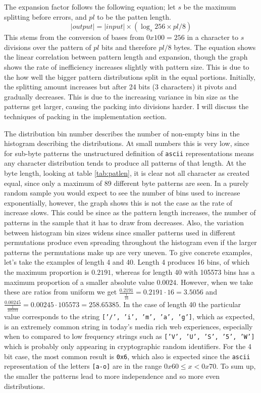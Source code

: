 \documentclass[ %
                    author={Samuel Russell},
                supervisor={Prof. Bogdan Warinschi},
                    degree={MEng},
                     title={Innocuous Ciphertexts},
                  subtitle={The DE-CENSOR Scheme},
                      type={research},
                      year={2018} ]{dissertation}
\begin{document}
The expansion factor follows the following equation; let $s$ be the maximum splitting before errors, and $pl$ to be the patten length.
$$|output| = |input| \times \left( \log_s 256 \times pl / 8 \right)$$ 
This stems from the conversion of bases from $0x100=256$ in a character to $s$ divisions over the pattern of $pl$ bits and therefore $pl/8$ bytes. The equation shows the linear correlation between pattern length and expansion, though the graph shows the rate of inefficiency increases slightly with pattern size. This is due to the how well the bigger pattern distributions split in the equal portions. Initially, the splitting amount increases but after 24 bits (3 characters) it pivots and gradually decreases.  This is due to the increasing variance in bin size as the patterns get larger, causing the packing into divisions harder. I will discuss the techniques of packing in the implementation section. 

The distribution bin number describes the number of non-empty bins in the histogram describing the distributions.
At small numbers this is very low, since for sub-byte patterns the unstructured definition of \texttt{ascii} representations means any character distribution tends to produce all patterns of that length.
At the byte length, looking at table \ref{tab:patlen}, it is clear not all character as created equal, since only a maximum of 89 different byte patterns are seen.
In a purely random sample you would expect to see the number of bins used to increase exponentially, however, the graph shows this is not the case as the rate of increase slows.
This could be since as the pattern length increases, the number of patterns in the sample that it has to draw from decreases.
Also, the variation between histogram bin sizes widens since smaller patterns used in different permutations produce even spreading throughout the histogram even if the larger patterns the permutations make up are very uneven.
To give concrete examples, let's take the examples of length 4 and 40.
Length 4 produces 16 bins, of which the maximum proportion is $0.2191$, whereas for length 40 with 105573 bins has a maximum proportion of a smaller absolute value $0.0024$.
However, when we take these are ratios from uniform we get $\frac{0.2191}{\frac{1}{16}} = 0.2191 \cdot 16 = 3.5056$ and $\frac{0.00245}{\frac{1}{105573}} = 0.00245 \cdot 105573 = 258.65385$.
In the case of length 40 the particular value corresponds to the string \texttt{['/', 'i', 'm', 'a', 'g']}, which as expected, is an extremely common string in today's media rich web experiences, especially when to compared to low frequency strings such as \texttt{['V', 'U', 'S', '5', 'W']} which is probably only appearing in cryptographic random identifiers.
For the 4 bit case, the most common result is \texttt{0x6}, which also is expected since the \texttt{ascii} representation of the letters \texttt{[a-o]} are in the range $0x60 \leq x < 0x70$.
To sum up, the smaller the patterns lead to more independence and so more even distributions. 
\end{document}

